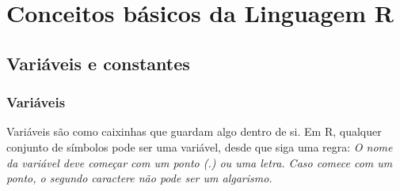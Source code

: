 \chapter{ Conceitos básicos da Linguagem R}
  \begin{comment}
      
    Prof. Dr. Ausberto S. Castro Vera
    UENF - CCT - LCMAT - Curso de Ciência da Computação
    Campos, RJ,  2021
    Disciplina: Paradigmas de Linguagens de Programação
    Falta colocar as referências que foram:
    https://cran.r-project.org/manuals.html
    https://cran.r-project.org/doc/manuals/r-release/R-intro.html
    https://cran.r-project.org/doc/manuals/r-release/R-lang.html
    https://cran.r-project.org/doc/manuals/r-release/R-ints.html
    http://www.lampada.uerj.br/arquivosdb/_book2/estruturas-b%
    Também existem as versões em PDF
    Data de entrega: 21 de set. 15:59
    Aspectos Básicos da Linguagem:
    variáveis, tipos de dados, controle de fluxo, etc.

    Os livros básicos para o estudo da Linguagem R são: \cite{Cotton2013}, \cite{Kabacoff2015}, \cite{Wickham2016}, e \cite{Lander2017}, \cite{Chang2019}
    
    Um site sobre Cursos básicos R é:\\
    \url{https://didatica.tech/curso-de-r-online-para-iniciantes/}
    
    Neste capítulo é apresentado ....
    
    Segundo \cite{Sebesta2018}, a linguagem R,  . . .

    De acordo com \cite{Sebesta2018} e \cite{roy04}, a linguagem R . . .
    
    \cite{Sebesta2018} afirma que a linguagem R . . .
    
    Considerando que a linguagem R (\cite{Sebesta2018}, \cite{wat90}) é considerada como ....
  \end{comment}
  
  \section{Variáveis e constantes}
    \subsection{Variáveis}
      Variáveis são como caixinhas que guardam algo dentro de si. Em R, qualquer conjunto de símbolos pode ser uma variável, desde que siga uma regra:    \textit{O nome da variável deve começar com um ponto (.) ou uma letra. Caso comece com um ponto, o segundo caractere não pode ser um algarismo.}

